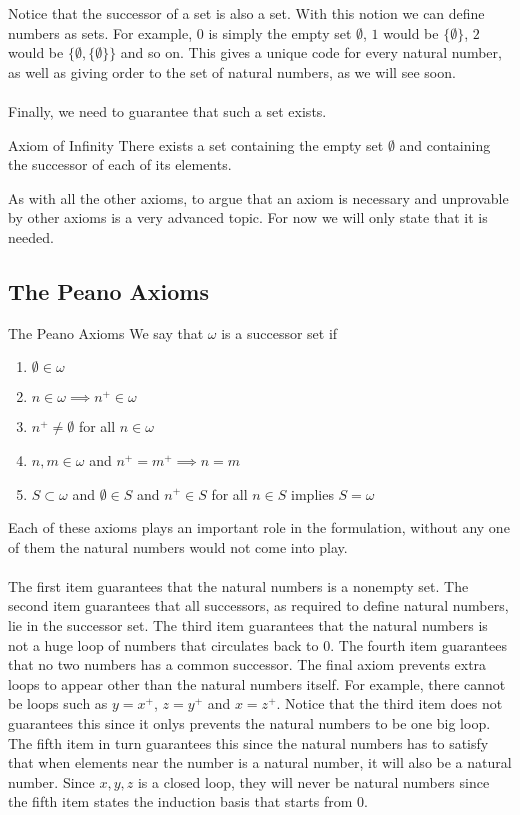 Notice that the successor of a set is also a set. With this notion we can define numbers as sets. For example, $0$ is simply the empty set $\emptyset$, $1$ would be $\{\emptyset\}$, $2$ would be $\{\emptyset,\{\emptyset\}\}$ and so on. This gives a unique code for every natural number, as well as giving order to the set of natural numbers, as we will see soon. \\~\\

Finally, we need to guarantee that such a set exists. 

\begin{axm}{Axiom of Infinity}{} There exists a set containing the empty set $\emptyset$ and containing the successor of each of its elements. 
\end{axm}

As with all the other axioms, to argue that an axiom is necessary and unprovable by other axioms is a very advanced topic. For now we will only state that it is needed. 

\subsection{The Peano Axioms}
\begin{defn}{The Peano Axioms}{} We say that $\omega$ is a successor set if
\begin{enumerate}
\item $\emptyset\in\omega$
\item $n\in\omega\implies n^+\in\omega$
\item $n^+\neq\emptyset$ for all $n\in\omega$
\item $n,m\in\omega$ and $n^+=m^+\implies n=m$
\item $S\subset\omega$ and $\emptyset\in S$ and $n^+\in S$ for all $n\in S$ implies $S=\omega$
\end{enumerate}
\end{defn}

Each of these axioms plays an important role in the formulation, without any one of them the natural numbers would not come into play. \\~\\
The first item guarantees that the natural numbers is a nonempty set. The second item guarantees that all successors, as required to define natural numbers, lie in the successor set. The third item guarantees that the natural numbers is not a huge loop of numbers that circulates back to $0$. The fourth item guarantees that no two numbers has a common successor. The final axiom prevents extra loops to appear other than the natural numbers itself. For example, there cannot be loops such as $y=x^+$, $z=y^+$ and $x=z^+$. Notice that the third item does not guarantees this since it onlys prevents the natural numbers to be one big loop. The fifth item in turn guarantees this since the natural numbers has to satisfy that when elements near the number is a natural number, it will also be a natural number. Since $x,y,z$ is a closed loop, they will never be natural numbers since the fifth item states the induction basis that starts from $0$. \\~\\

